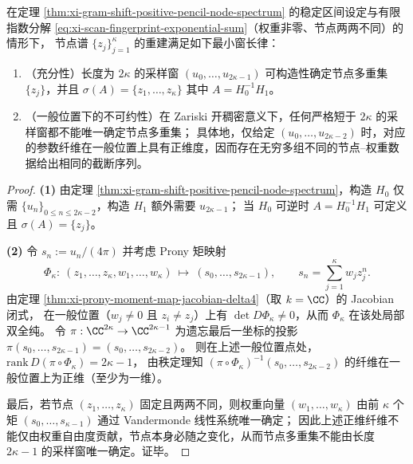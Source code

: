 \begin{theorem}\label{thm:xi-node-spectrum-minimal-window-2kappa}
在定理 \ref{thm:xi-gram-shift-positive-pencil-node-spectrum} 的稳定区间设定与有限指数分解 \eqref{eq:xi-scan-fingerprint-exponential-sum}（权重非零、节点两两不同）的情形下，
节点谱 \(\{z_j\}_{j=1}^{\kappa}\) 的重建满足如下最小窗长律：
\begin{enumerate}
  \item \textnormal{（充分性）}长度为 \(2\kappa\) 的采样窗 \((u_0,\dots,u_{2\kappa-1})\) 可构造性确定节点多重集 \(\{z_j\}\)，并且
  \(
  \sigma(A)=\{z_1,\dots,z_\kappa\}
  \)
  其中 \(A=H_0^{-1}H_1\)。
  \item \textnormal{（一般位置下的不可约性）}在 Zariski 开稠密意义下，任何严格短于 \(2\kappa\) 的采样窗都不能唯一确定节点多重集；
  具体地，仅给定 \((u_0,\dots,u_{2\kappa-2})\) 时，对应的参数纤维在一般位置上具有正维度，因而存在无穷多组不同的节点--权重数据给出相同的截断序列。
\end{enumerate}
\end{theorem}
\begin{proof}
\textbf{(1)} 由定理 \ref{thm:xi-gram-shift-positive-pencil-node-spectrum}，构造 \(H_0\) 仅需 \(\{u_n\}_{0\le n\le 2\kappa-2}\)，构造 \(H_1\) 额外需要 \(u_{2\kappa-1}\)；
当 \(H_0\) 可逆时 \(A=H_0^{-1}H_1\) 可定义且 \(\sigma(A)=\{z_j\}\)。
\par
\textbf{(2)} 令 \(s_n:=u_n/(4\pi)\) 并考虑 Prony 矩映射
\[
\Phi_{\kappa}:\ (z_1,\dots,z_\kappa,w_1,\dots,w_\kappa)\ \longmapsto\ (s_0,\dots,s_{2\kappa-1}),
\qquad
s_n=\sum_{j=1}^{\kappa}w_j z_j^{n}.
\]
由定理 \ref{thm:xi-prony-moment-map-jacobian-delta4}（取 \(k=\CC\)）的 Jacobian 闭式，
在一般位置（\(w_j\neq 0\) 且 \(z_i\neq z_j\)）上有 \(\det D\Phi_\kappa\neq 0\)，从而 \(\Phi_\kappa\) 在该处局部双全纯。
令 \(\pi:\CC^{2\kappa}\to\CC^{2\kappa-1}\) 为遗忘最后一坐标的投影
\(
\pi(s_0,\dots,s_{2\kappa-1})=(s_0,\dots,s_{2\kappa-2})
\)。
则在上述一般位置点处，
\(
\mathrm{rank}\,D(\pi\circ\Phi_\kappa)=2\kappa-1
\)，
由秩定理知 \((\pi\circ\Phi_\kappa)^{-1}(s_0,\dots,s_{2\kappa-2})\) 的纤维在一般位置上为正维（至少为一维）。
\par
最后，若节点 \((z_1,\dots,z_\kappa)\) 固定且两两不同，则权重向量 \((w_1,\dots,w_\kappa)\) 由前 \(\kappa\) 个矩 \((s_0,\dots,s_{\kappa-1})\) 通过 Vandermonde 线性系统唯一确定；
因此上述正维纤维不能仅由权重自由度贡献，节点本身必随之变化，从而节点多重集不能由长度 \(2\kappa-1\) 的采样窗唯一确定。证毕。
\end{proof}

